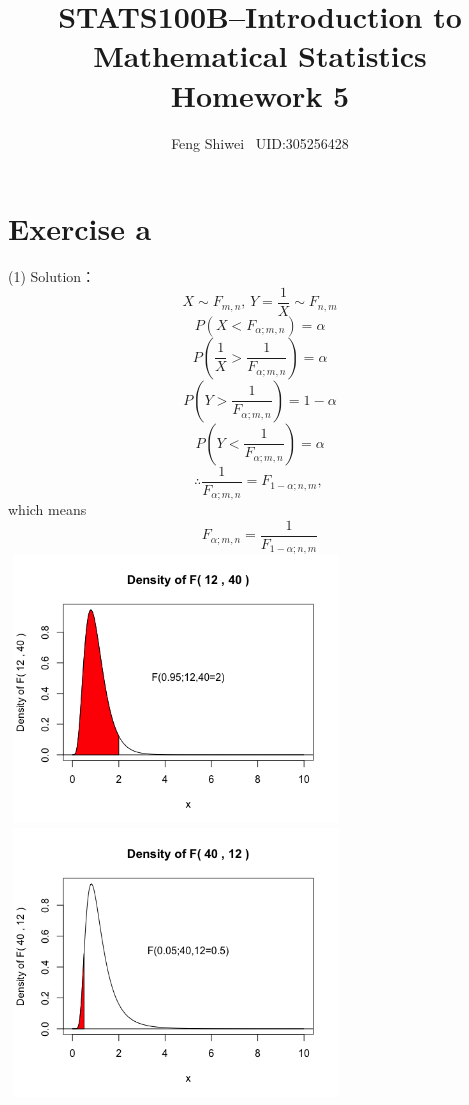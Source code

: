 \documentclass[a4papers]{ctexart}
\title{STATS100B--Introduction to Mathematical Statistics \\Homework 5}
\author{Feng Shiwei \ UID:305256428}
\date{}
\begin{document}
\maketitle
\section*{Exercise a}
\noindent(1) Solution：
\indent 
\[ X\sim F_{m,n},\, Y=\dfrac{1}{X}\sim F_{n,m}  \]
\[ P(X<F_{\alpha;m,n}) = \alpha\]
\[ P(\dfrac{1}{X} > \dfrac{1}{F_{\alpha;m,n}}) = \alpha\]
\[ P(Y > \dfrac{1}{F_{\alpha;m,n}}) = 1-\alpha\]
\[ P(Y < \dfrac{1}{F_{\alpha;m,n}}) = \alpha\]
\[ \therefore \dfrac{1}{F_{\alpha;m,n}} = F_{1-\alpha;n,m},\, \]
    which means
\[ F_{\alpha;m,n} = \dfrac{1}{F_{1-\alpha;n,m}} \]
\includegraphics[width=3.5in, height=2.8in]{f-12-40.png}
\includegraphics[width=3.5in, height=2.8in]{f-40-12.png}
\end{document}
